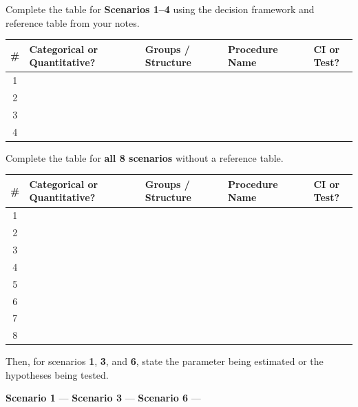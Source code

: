 \documentclass[10pt]{article}
\begin{document}
\vspace{0.1in}

\begin{tcolorbox}[colback=white, colframe=black!40,
    title=\textbf{Tier R --- Remediate},
    fonttitle=\bfseries, arc=2mm, left=3mm, right=3mm, top=2mm, bottom=2mm]

Complete the table for \textbf{Scenarios 1--4} using the decision framework and reference table
from your notes.

\vspace{0.1in}
\renewcommand{\arraystretch}{2.0}
\begin{tabularx}{\linewidth}{@{} c X X X c @{}}
  \rowcolor{sky}
  \textbf{\#} & \textbf{Categorical or Quantitative?} & \textbf{Groups / Structure} & \textbf{Procedure Name} & \textbf{CI or Test?} \\
  \hline
  1 & & & & \\
  2 & & & & \\
  3 & & & & \\
  4 & & & & \\
\end{tabularx}
\end{tcolorbox}

\begin{tcolorbox}[colback=white, colframe=black!40,
    title=\textbf{Tier A --- Approaching Proficiency},
    fonttitle=\bfseries, arc=2mm, left=3mm, right=3mm, top=2mm, bottom=2mm]

Complete the table for \textbf{all 8 scenarios} without a reference table.

\vspace{0.1in}
\renewcommand{\arraystretch}{2.0}
\begin{tabularx}{\linewidth}{@{} c X X X c @{}}
  \rowcolor{sky}
  \textbf{\#} & \textbf{Categorical or Quantitative?} & \textbf{Groups / Structure} & \textbf{Procedure Name} & \textbf{CI or Test?} \\
  \hline
  1 & & & & \\
  2 & & & & \\
  3 & & & & \\
  4 & & & & \\
  5 & & & & \\
  6 & & & & \\
  7 & & & & \\
  8 & & & & \\
\end{tabularx}

\vspace{0.1in}
Then, for scenarios \textbf{1}, \textbf{3}, and \textbf{6}, state the parameter being estimated
or the hypotheses being tested.

\vspace{0.05in}
\textbf{Scenario 1} --- \writeline
\textbf{Scenario 3} --- \writeline
\textbf{Scenario 6} --- \writeline
\end{tcolorbox}
\end{document}
